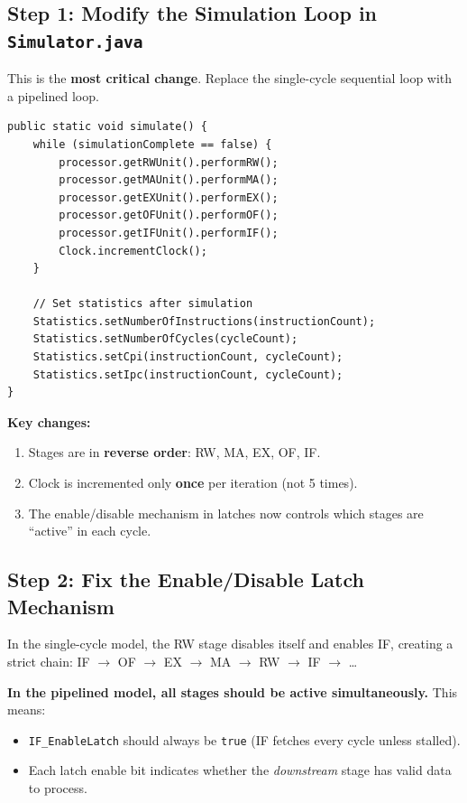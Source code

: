 \documentclass[12pt,a4paper]{article}
\begin{document}
\subsection{Step 1: Modify the Simulation Loop in \texttt{Simulator.java}}

This is the \textbf{most critical change}. Replace the single-cycle sequential loop with a pipelined loop.

\begin{lstlisting}[style=javastyle, caption={New pipelined simulation loop in \texttt{Simulator.java}}]
public static void simulate() {
    while (simulationComplete == false) {
        processor.getRWUnit().performRW();
        processor.getMAUnit().performMA();
        processor.getEXUnit().performEX();
        processor.getOFUnit().performOF();
        processor.getIFUnit().performIF();
        Clock.incrementClock();
    }

    // Set statistics after simulation
    Statistics.setNumberOfInstructions(instructionCount);
    Statistics.setNumberOfCycles(cycleCount);
    Statistics.setCpi(instructionCount, cycleCount);
    Statistics.setIpc(instructionCount, cycleCount);
}
\end{lstlisting}

\begin{keypoint}
\textbf{Key changes:}
\begin{enumerate}
    \item Stages are in \textbf{reverse order}: RW, MA, EX, OF, IF.
    \item Clock is incremented only \textbf{once} per iteration (not 5 times).
    \item The enable/disable mechanism in latches now controls which stages are ``active'' in each cycle.
\end{enumerate}
\end{keypoint}

\subsection{Step 2: Fix the Enable/Disable Latch Mechanism}

In the single-cycle model, the RW stage disables itself and enables IF, creating a strict chain: IF $\rightarrow$ OF $\rightarrow$ EX $\rightarrow$ MA $\rightarrow$ RW $\rightarrow$ IF $\rightarrow$ \ldots

\textbf{In the pipelined model, all stages should be active simultaneously.} This means:

\begin{itemize}
    \item \texttt{IF\_EnableLatch} should always be \texttt{true} (IF fetches every cycle unless stalled).
    \item Each latch enable bit indicates whether the \textit{downstream} stage has valid data to process.
\end{itemize}
\end{document}
